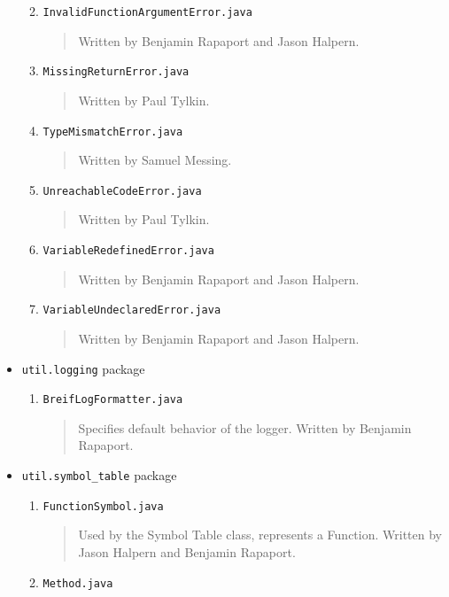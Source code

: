 \documentclass{book}
\begin{document}
\begin{itemize}
\begin{enumerate}
\begin{quotation}
\end{quotation}
\item \texttt{InvalidFunctionArgumentError.java}
\begin{quotation}
\noindent Written by Benjamin Rapaport and Jason Halpern. 
\end{quotation}
\item \texttt{MissingReturnError.java}
\begin{quotation}
\noindent Written by Paul Tylkin. 
\end{quotation}
\item \texttt{TypeMismatchError.java}
\begin{quotation}
\noindent Written by Samuel Messing. 
\end{quotation}
\item \texttt{UnreachableCodeError.java}
\begin{quotation}
\noindent Written by Paul Tylkin. 
\end{quotation}
\item \texttt{VariableRedefinedError.java}
\begin{quotation}
\noindent Written by Benjamin Rapaport and Jason Halpern. 
\end{quotation}
\item \texttt{VariableUndeclaredError.java}
\begin{quotation}
\noindent Written by Benjamin Rapaport and Jason Halpern. 
\end{quotation}
\end{enumerate} %
\item \texttt{util.logging} package
\begin{enumerate}
\item \texttt{BreifLogFormatter.java}
\begin{quotation}
\noindent Specifies default behavior of the logger. Written by Benjamin Rapaport. 
\end{quotation}
\end{enumerate} %
\item \texttt{util.symbol\_table} package
\begin{enumerate}
\item \texttt{FunctionSymbol.java}
\begin{quotation}
\noindent Used by the Symbol Table class, represents a Function. Written by Jason Halpern and Benjamin Rapaport. 
\end{quotation}
\item \texttt{Method.java}
\begin{quotation}

\end{quotation}
\end{enumerate}
\end{itemize}
\end{document}
